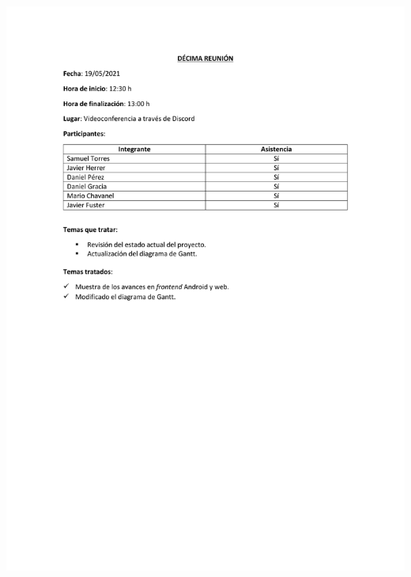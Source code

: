 \documentclass{article}
\begin{document}
\includegraphics[width=\textwidth]{../images/actas/Acta_reunion_10.pdf}
\end{document}
